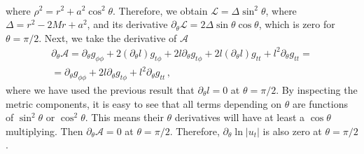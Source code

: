 \documentclass{aa}
\begin{document}
\begin{appendix}
\begin{eqnarray}
\end{eqnarray}
where $\rho^2 = r^2 + a^2\cos^2 \theta$. Therefore, we obtain $\mathcal{L} = \Delta \sin^2 \theta$, where $\Delta = r^2 - 2Mr + a^2$, and its derivative $\partial_{\theta}\mathcal{L} = 2 \Delta \sin \theta \cos \theta$, which is zero for $\theta = \pi/2$. Next, we take the derivative of $\mathcal{A}$
\begin{eqnarray}
\partial_{\theta} \mathcal{A} = \partial_{\theta} g_{\phi\phi} + 2 (\partial_{\theta} l) g_{t\phi} + 2l\partial_{\theta} g_{t\phi} + 2l(\partial_{\theta} l) g_{tt} + l^2 \partial_{\theta} g_{tt} = 
\nonumber \\
= \partial_{\theta} g_{\phi\phi} + 2l\partial_{\theta} g_{t\phi} + l^2 \partial_{\theta} g_{tt}\,,
\end{eqnarray}
where we have used the previous result that $\partial_{\theta} l=0$ at $\theta = \pi/2$. By inspecting the metric components, it is easy to see that all terms depending on $\theta$ are functions of $\sin^2 \theta$ or $\cos^2 \theta$. This means their $\theta$ derivatives will have at least a $\cos \theta$ multiplying. Then $\partial_{\theta} \mathcal{A} = 0$ at $\theta = \pi/2$. Therefore, $\partial_{\theta} \ln|u_t|$ is also zero at $\theta = \pi/2$.


\end{appendix}
\end{document}
